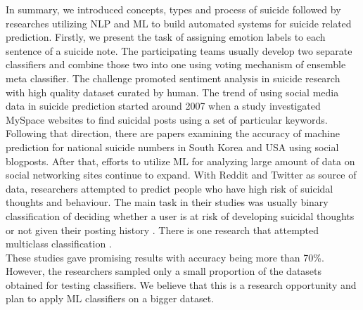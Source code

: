 In summary, we introduced concepts, types and process of suicide followed by researches utilizing NLP and ML to build automated systems for suicide related prediction. Firstly, we present the task of assigning emotion labels to each sentence of a suicide note. The participating teams usually develop two separate classifiers and combine those two into one using voting mechanism of ensemble meta classifier. The challenge promoted sentiment analysis in suicide research with high quality dataset curated by human. The trend of using social media data in suicide prediction started around 2007 when a study investigated MySpace websites to find suicidal posts using a set of particular keywords.\\
Following that direction, there are papers examining the accuracy of machine prediction for national suicide numbers in South Korea and USA using social blogposts. After that, efforts to utilize ML for analyzing large amount of data on social networking sites continue to expand. With Reddit and Twitter as source of data, researchers attempted to predict people who have high risk of suicidal thoughts and behaviour. The main task in their studies was usually binary classification of deciding whether a user is at risk of developing suicidal thoughts or not given their posting history \cite{DeChoudhury2017, DeChoudhury2017, Coppersmith2016} . There is one research that attempted multiclass classification \cite{Burnap2015}.\\
These studies gave promising results with accuracy being more than 70\%. However, the researchers sampled only a small proportion of the datasets obtained for testing classifiers. We believe that this is a research opportunity and plan to apply ML classifiers on a bigger dataset.  




  

